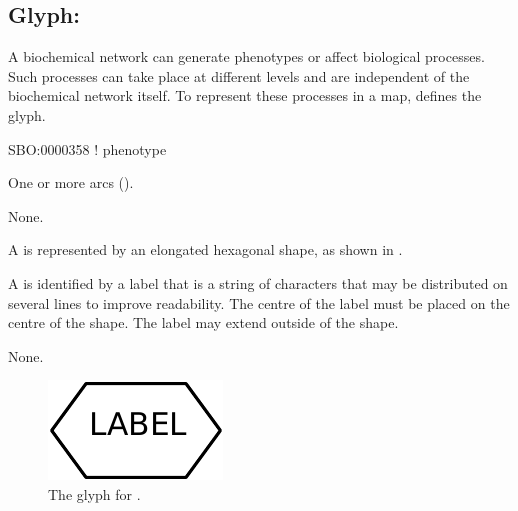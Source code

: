 \subsection{Glyph: }
\label{sec:phenotype}

A biochemical network can generate phenotypes or affect biological processes.
Such processes can take place at different levels and are independent of the biochemical network itself.
To represent these processes in a map, \PD defines the  glyph.

\begin{glyphDescription}

\glyphSboTerm
SBO:0000358 ! phenotype


\glyphIncoming
One or more  arcs ().



\glyphOutgoing
None.


\glyphContainer
A  is represented by an elongated hexagonal shape, as shown in .

\glyphLabel
A  is identified by a label that is  a string of characters that may be distributed on several lines to improve readability.
The centre of the label must be placed on the centre of the shape.
The label may extend outside of the shape.

\glyphAux 
None.

\end{glyphDescription}

\begin{figure}[H]
  \centering
  \includegraphics{images/build/phenotype.pdf}
  \caption{The \PD glyph for .}
  \label{fig:phenotype}
\end{figure}

